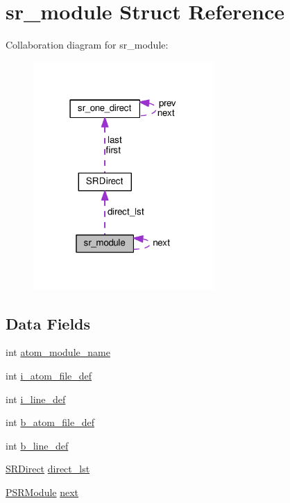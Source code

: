 \hypertarget{structsr__module}{}\section{sr\+\_\+module Struct Reference}
\label{structsr__module}


Collaboration diagram for sr\+\_\+module\+:\nopagebreak
\begin{figure}[H]
\begin{center}
\leavevmode
\includegraphics[width=195pt]{structsr__module__coll__graph}
\end{center}
\end{figure}
\subsection*{Data Fields}
\begin{DoxyCompactItemize}
\item 
int \hyperlink{structsr__module_a5a1f181c93f13928623ca1426439eac8}{atom\+\_\+module\+\_\+name}
\item 
int \hyperlink{structsr__module_a2c69e68be4245afea2ed7d5a69650166}{i\+\_\+atom\+\_\+file\+\_\+def}
\item 
int \hyperlink{structsr__module_a931a2655c0576f16e2776c5c7ac2cf0a}{i\+\_\+line\+\_\+def}
\item 
int \hyperlink{structsr__module_acc4948aadab6f3f5ae47ee8ea8c083ee}{b\+\_\+atom\+\_\+file\+\_\+def}
\item 
int \hyperlink{structsr__module_a0c96bc2505a798a709775e61787a1a24}{b\+\_\+line\+\_\+def}
\item 
\hyperlink{structSRDirect}{S\+R\+Direct} \hyperlink{structsr__module_a45a2eaca81407f38373afb940bb6dc57}{direct\+\_\+lst}
\item 
\hyperlink{src__rdr__c_8c_a7b7b810e558b3c117d7b119c5c59f363}{P\+S\+R\+Module} \hyperlink{structsr__module_af8c9ce6870c7f7558096b050d6df683b}{next}
\end{DoxyCompactItemize}



